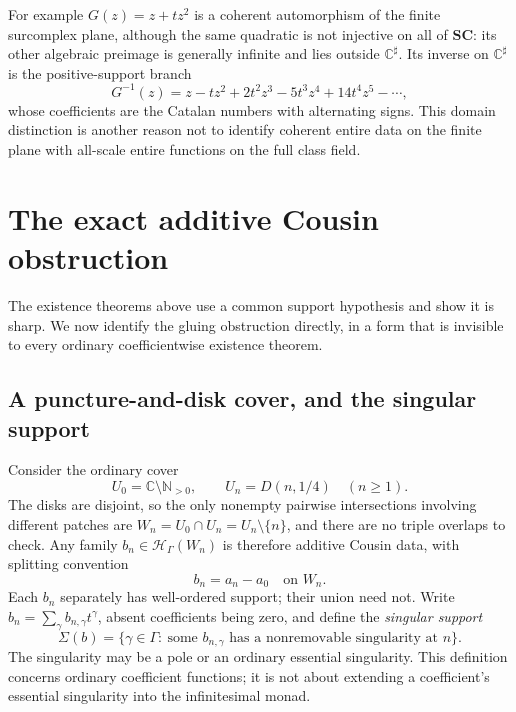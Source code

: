 \documentclass[11pt,letterpaper]{article}
\theoremstyle{definition}
\theoremstyle{remark}
\newcommand{\SC}{\mathbf{SC}}
\newcommand{\C}{\mathbb C}
\newcommand{\N}{\mathbb N}
\newcommand{\HH}{\mathscr H_\Gamma}
\newcommand{\sh}{^{\sharp}}
\numberwithin{equation}{section}
\begin{document}
For example $G(z)=z+tz^2$ is a coherent automorphism of the finite surcomplex plane, although the same quadratic is not injective on all of $\SC$: its other algebraic preimage is generally infinite and lies outside $\C\sh$. Its inverse on $\C\sh$ is the positive-support branch
\[
  G^{-1}(z)=z-tz^2+2t^2z^3-5t^3z^4+14t^4z^5-\cdots,
\]
whose coefficients are the Catalan numbers with alternating signs. This domain distinction is another reason not to identify coherent entire data on the finite plane with all-scale entire functions on the full class field.

\section{The exact additive Cousin obstruction}\label{global:sec:cousin}

The existence theorems above use a common support hypothesis and show it is sharp. We now identify the gluing obstruction directly, in a form that is invisible to every ordinary coefficientwise existence theorem.

\subsection{A puncture-and-disk cover, and the singular support}

Consider the ordinary cover
\begin{equation}\label{global:eq:starcover}
  U_0=\C\setminus\N_{>0},
  \qquad U_n=D(n,1/4)\quad(n\ge1).
\end{equation}
The disks are disjoint, so the only nonempty pairwise intersections involving different patches are $W_n=U_0\cap U_n=U_n\setminus\{n\}$, and there are no triple overlaps to check. Any family $b_n\in\HH(W_n)$ is therefore additive Cousin data, with splitting convention
\begin{equation}\label{global:eq:cousinsplit}
  b_n=a_n-a_0\quad\text{on }W_n .
\end{equation}
Each $b_n$ separately has well-ordered support; their union need not. Write $b_n=\sum_\gamma b_{n,\gamma}t^\gamma$, absent coefficients being zero, and define the \emph{singular support}
\begin{equation}\label{global:eq:singularsupport}
  \Sigma(b)=\{\gamma\in\Gamma:\ \text{some }b_{n,\gamma}
  \text{ has a nonremovable singularity at }n\}.
\end{equation}
The singularity may be a pole or an ordinary essential singularity. This definition concerns ordinary coefficient functions; it is not about extending a coefficient's essential singularity into the infinitesimal monad.
\end{document}

